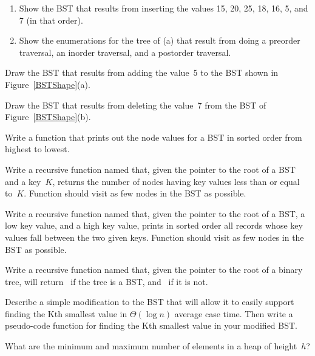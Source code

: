 \begin{exercises}
\item
\begin{enumerate}
\item
Show the BST that results from inserting the values
15, 20, 25, 18, 16, 5, and 7 (in that order).

\item
Show the enumerations for the tree of (a) that result from doing a
preorder traversal, an inorder traversal, and a postorder traversal.
\end{enumerate}

\item
Draw the BST that results from adding the value~5 to the BST
shown in Figure~\ref{BSTShape}(a).

\item
Draw the BST that results from deleting the value~7 from the BST of
Figure~\ref{BSTShape}(b).

\item
Write a function that prints out the node values for a BST in sorted
order from highest to lowest.

\item
Write a recursive function named  that, given the
pointer to the root of a BST and a key~\(K\), returns the number of
nodes having key values less than or equal to~\(K\).
Function  should visit as few nodes in the BST as
possible.

\item
\label{BSTRangeExer}
Write a recursive function named  that, given the
pointer to the root of a BST, a low key value, and a high key value,
prints in sorted order all records whose key values fall between the
two given keys.
Function 
should visit as few nodes in the BST as possible.

\item
Write a recursive function named  that, given the
pointer to the root of a binary tree, will return \TRUE\ if the tree
is a BST, and \FALSE\ if it is not.

\item
Describe a simple modification to the BST that will allow it to easily
support finding the Kth smallest value in 
$\Theta(\log n)$ average case time.
Then write a pseudo-code function for finding the Kth smallest value
in your modified BST.

\item
What are the minimum and maximum number of elements in a heap of
height~\(h\)?


\end{exercises}
